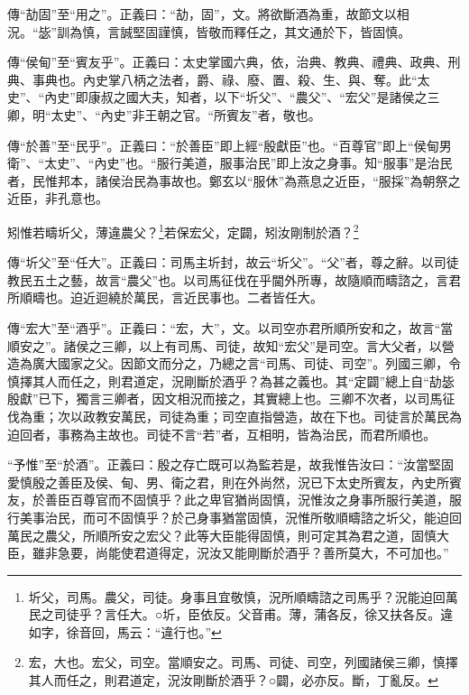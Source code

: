 {\noindent\zhuan{}\fzbyks 傳“劼固”至“用之”。正義曰：“劼，固”，文。將欲斷酒為重，故節文以相況。“毖”訓為慎，言誠堅固謹慎，皆敬而釋任之，其文通於下，皆固慎。 \par}

{\noindent\zhuan{}\fzbyks 傳“侯甸”至“賓友乎”。正義曰：太史掌國六典，依，治典、教典、禮典、政典、刑典、事典也。內史掌八柄之法者，爵、祿、廢、置、殺、生、與、奪。此“太史”、“內史”即康叔之國大夫，知者，以下“圻父”、“農父”、“宏父”是諸侯之三卿，明“太史”、“內史”非王朝之官。“所賓友”者，敬也。 \par}

{\noindent\zhuan{}\fzbyks 傳“於善”至“民乎”。正義曰：“於善臣”即上經“殷獻臣”也。“百尊官”即上“侯甸男衛”、“太史”、“內史”也。“服行美道，服事治民”即上汝之身事。知“服事”是治民者，民惟邦本，諸侯治民為事故也。鄭玄以“服休”為燕息之近臣，“服採”為朝祭之近臣，非孔意也。 \par}

矧惟若疇圻父，薄違農父？\footnote{圻父，司馬。農父，司徒。身事且宜敬慎，況所順疇諮之司馬乎？況能迫回萬民之司徒乎？言任大。○圻，臣依反。父音甫。薄，蒲各反，徐又扶各反。違如字，徐音回，馬云：“違行也。”}若保宏父，定闢，矧汝剛制於酒？\footnote{宏，大也。宏父，司空。當順安之。司馬、司徒、司空，列國諸侯三卿，慎擇其人而任之，則君道定，況汝剛斷於酒乎？○闢，必亦反。斷，丁亂反。}

{\noindent\zhuan{}\fzbyks 傳“圻父”至“任大”。正義曰：司馬主圻封，故云“圻父”。“父”者，尊之辭。以司徒教民五土之藝，故言“農父”也。以司馬征伐在乎閫外所專，故隨順而疇諮之，言君所順疇也。迫近迴繞於萬民，言近民事也。二者皆任大。 \par}

{\noindent\zhuan{}\fzbyks 傳“宏大”至“酒乎”。正義曰：“宏，大”，文。以司空亦君所順所安和之，故言“當順安之”。諸侯之三卿，以上有司馬、司徒，故知“宏父”是司空。言大父者，以營造為廣大國家之父。因節文而分之，乃總之言“司馬、司徒、司空”。列國三卿，令慎擇其人而任之，則君道定，況剛斷於酒乎？為甚之義也。其“定闢”總上自“劼毖殷獻”已下，獨言三卿者，因文相況而接之，其實總上也。三卿不次者，以司馬征伐為重；次以政教安萬民，司徒為重；司空直指營造，故在下也。司徒言於萬民為迫回者，事務為主故也。司徒不言“若”者，互相明，皆為治民，而君所順也。 \par}

{\noindent\shu{}\fzkt “予惟”至“於酒”。正義曰：殷之存亡既可以為監若是，故我惟告汝曰：“汝當堅固愛慎殷之善臣及侯、甸、男、衛之君，則在外尚然，況已下太史所賓友，內史所賓友，於善臣百尊官而不固慎乎？此之卑官猶尚固慎，況惟汝之身事所服行美道，服行美事治民，而可不固慎乎？於己身事猶當固慎，況惟所敬順疇諮之圻父，能迫回萬民之農父，所順所安之宏父？此等大臣能得固慎，則可定其為君之道，固慎大臣，雖非急要，尚能使君道得定，況汝又能剛斷於酒乎？善所莫大，不可加也。” \par}

